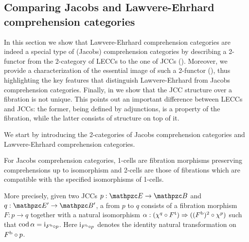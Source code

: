 \documentclass{lmcs} %
\theoremstyle{plain}\newtheorem{satz}[thm]{Satz} %
\begin{document}
			
			\subsection{Comparing Jacobs and Lawvere-Ehrhard comprehension categories}
			\label{sect:lcomp-vs-jcomp}

In this section we show that Lawvere-Ehrhard comprehension categories are indeed a special type of (Jacobs) comprehension categories by describing a 2-functor from the 2-category of LECCs to the one of JCCs (). 
Moreover, we provide a characterization of the essential image of such a 2-functor (), 
thus highlighting the key features that  distinguish Lawvere-Ehrhard from Jacobs comprehension categories. 
% 
Finally, in  we show that the JCC structure over a fibration is not unique. 
This points out an important difference between LECCs and JCCs: 
the former, being defined by adjunctions, is a property of the fibration, while the latter consists of structure on top of it. 

We start by introducing the 2-categories of Jacobs comprehension categories and Lawvere-Ehrhard comprehension categories. 

% 
For Jacobs comprehension categories, 1-cells are fibration morphisms preserving comprehensions up to isomorphism 
and 2-cells are those of fibrations which are compatible with the specified isomorphisms of 1-cells. 

More precisely,  given two JCCs $p:\ct{E}\to\ct{B}$ and $q:\ct{E'}\to \ct{B'}$, a  from $p$ to $q$ consists of a fibration morphism $F:p\to q$ together with a natural isomorphism $\alpha:(\chi^{q}\circ {F}^{\mathrm{t}})\Rightarrow (({F}^{\mathrm{b}})^{2}\circ \chi^{p})$ such that $\mathop{\mathrm{cod}}\nolimits\alpha=\mathrm{i}_{{F}^{\mathrm{b}}\circ p}$. Here $\mathrm{i}_{{F}^{\mathrm{b}}\circ p}$ denotes the identity natural transformation on ${F}^{\mathrm{b}}\circ p$.
\end{document}
